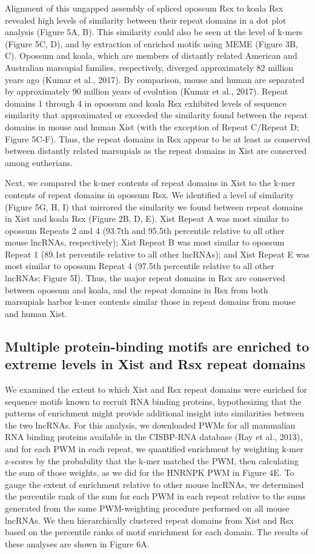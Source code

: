 Alignment of this ungapped assembly of spliced opossum Rsx to koala Rsx revealed high levels of similarity between their repeat domains in a dot plot analysis (Figure 5A, B). This similarity could also be seen at the level of k-mers (Figure 5C, D), and by extraction of enriched motifs using MEME (Figure 3B, C). Opossum and koala, which are members of distantly related American and Australian marsupial families, respectively, diverged approximately 82 million years ago (Kumar et al., 2017). By comparison, mouse and human are separated by approximately 90 million years of evolution (Kumar et al., 2017). Repeat domains 1 through 4 in opossum and koala Rsx exhibited levels of sequence similarity that approximated or exceeded the similarity found between the repeat domains in mouse and human Xist (with the exception of Repeat C/Repeat D; Figure 5C-F). Thus, the repeat domains in Rsx appear to be at least as conserved between distantly related marsupials as the repeat domains in Xist are conserved among eutherians.

Next, we compared the k-mer contents of repeat domains in Xist to the k-mer contents of repeat domains in opossum Rsx. We identified a level of similarity (Figure 5G, H, I) that mirrored the similarity we found between repeat domains in Xist and koala Rsx (Figure 2B, D, E). Xist Repeat A was most similar to opossum Repeats 2 and 4 (93.7th and 95.5th percentile relative to all other mouse lncRNAs, respectively); Xist Repeat B was most similar to opossum Repeat 1 (89.1st percentile relative to all other lncRNAs); and Xist Repeat E was most similar to opossum Repeat 4 (97.5th percentile relative to all other lncRNAs; Figure 5I). Thus, the major repeat domains in Rsx are conserved between opossum and koala, and the repeat domains in Rsx from both marsupials harbor k-mer contents similar those in repeat domains from mouse and human Xist.

\subsection{Multiple protein-binding motifs are enriched to extreme levels in Xist and Rsx repeat domains}
We examined the extent to which Xist and Rsx repeat domains were enriched for sequence motifs known to recruit RNA binding proteins, hypothesizing that the patterns of enrichment might provide additional insight into similarities between the two lncRNAs. For this analysis, we downloaded PWMs for all mammalian RNA binding proteins available in the CISBP-RNA database (Ray et al., 2013), and for each PWM in each repeat, we quantified enrichment by weighting k-mer z-scores by the probability that the k-mer matched the PWM, then calculating the sum of those weights, as we did for the HNRNPK PWM in Figure 4E. To gauge the extent of enrichment relative to other mouse lncRNAs, we determined the percentile rank of the sum for each PWM in each repeat relative to the sums generated from the same PWM-weighting procedure performed on all mouse lncRNAs. We then hierarchically clustered repeat domains from Xist and Rsx based on the percentile ranks of motif enrichment for each domain. The results of these analyses are shown in Figure 6A.

